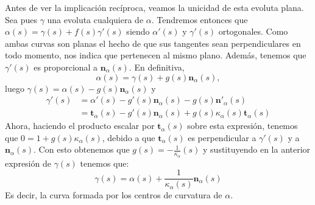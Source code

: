 Antes de ver la implicación recíproca, veamos la unicidad de esta evoluta plana.
Sea pues $\gamma$ una evoluta cualquiera de $\alpha$. Tendremos entonces que
$\alpha\left( s \right) = \gamma\left( s \right) + f\left( s
\right)\gamma'\left( s \right)$ siendo $\alpha'\left( s \right)$ y
$\gamma'\left( s \right)$ ortogonales. Como ambas curvas son planas el hecho de
que sus tangentes sean perpendiculares en todo momento, nos indica que
pertenecen al mismo plano. Además, tenemos que $\gamma'\left( s \right)$ es
proporcional a $\mathbf{n}_{\alpha}\left( s \right)$. En definitiva,
\[
\alpha\left( s \right) = \gamma\left( s \right) + g\left( s
\right)\mathbf{n}_{\alpha} \left( s \right),
\]
luego $\gamma\left( s \right) = \alpha\left( s \right) - g\left( s
\right)\mathbf{n}_{\alpha}\left( s \right)$ y
\begin{align*}
    \gamma'\left( s \right) &= \alpha'\left( s \right) - g'\left( s \right)
    \mathbf{n}_{\alpha}\left( s \right) - g\left( s
    \right)\mathbf{n}'_{\alpha}\left( s \right)\\
    &= \mathbf{t}_{\alpha}\left( s \right) - g'\left( s
    \right)\mathbf{n}_{\alpha}\left( s \right) + g\left( s \right)
    \kappa_{\alpha}\left( s \right) \mathbf{t}_{\alpha}\left( s \right)
\end{align*}
Ahora, haciendo el producto escalar por $\mathbf{t}_{\alpha}\left( s \right)$
sobre esta expresión, tenemos que $0 = 1 + g\left( s
\right)\kappa_{\alpha}\left( s \right)$, debido a que $\mathbf{t}_{\alpha}\left(
s\right)$ es perpendicular a $\gamma'\left( s \right)$ y a
$\mathbf{n}_{\alpha}\left( s \right)$. Con esto obtenemos que $g\left( s \right)
= -\frac{1}{\kappa_{\alpha}}\left( s \right)$ y sustituyendo en la anterior
expresión de $\gamma\left( s \right)$ tenemos que:
\[
\gamma\left( s \right) = \alpha\left( s \right) + \frac{1}{\kappa_{\alpha}\left(
s \right)} \mathbf{n}_{\alpha}\left( s \right)
\]
Es decir, la curva formada por los centros de curvatura de $\alpha$.
